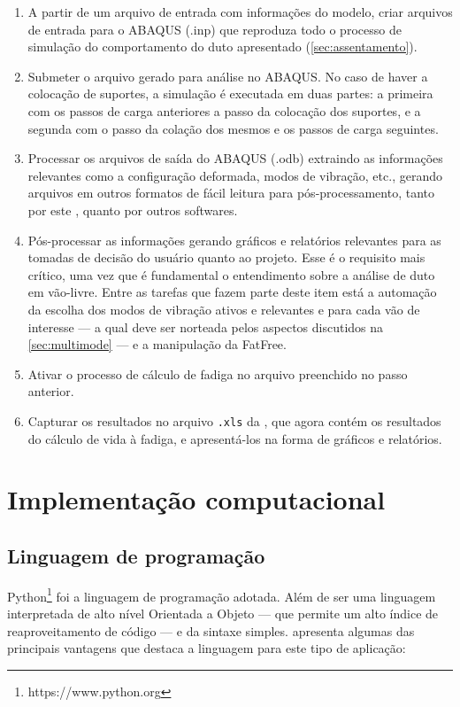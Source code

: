 \begin{enumerate}[label= (\arabic*)]
    \item A partir de um arquivo de entrada com informações do modelo, criar arquivos de entrada para o ABAQUS (.inp) que reproduza todo o processo de simulação do comportamento do duto apresentado (\autoref{sec:assentamento}).
    \item Submeter o arquivo gerado para análise no ABAQUS. No caso de haver a colocação de suportes, a simulação é executada em duas partes: a primeira com os passos de carga anteriores a passo da colocação dos suportes, e a segunda com o passo da colação dos mesmos e os passos de carga seguintes.
    \item Processar os arquivos de saída do ABAQUS (.odb) extraindo as informações relevantes como a configuração deformada, modos de vibração, etc., gerando arquivos em outros formatos de fácil leitura para pós-processamento, tanto por este \frame, quanto por outros softwares.
    \item Pós-processar as informações gerando gráficos e relatórios relevantes para as tomadas de decisão do usuário quanto ao projeto. Esse é o requisito mais crítico, uma vez que é fundamental o entendimento sobre a análise de duto em vão-livre. Entre as tarefas que fazem parte deste item está a automação da escolha dos modos de vibração ativos e relevantes e para cada vão de interesse --- a qual deve ser norteada pelos aspectos discutidos na \autoref{sec:multimode} --- e a manipulação da FatFree.
    \item Ativar o processo de cálculo de fadiga no arquivo preenchido no passo anterior.
    \item Capturar os resultados no arquivo \texttt{.xls} da \fatfree, que agora contém os resultados do cálculo de vida à fadiga, e apresentá-los na forma de gráficos e relatórios.
\end{enumerate}


\section{Implementação computacional}


\subsection{Linguagem de programação}

Python\footnote{https://www.python.org} foi a linguagem de programação adotada. Além de ser uma linguagem interpretada de alto nível Orientada a Objeto --- que permite um alto índice de reaproveitamento de código --- e da sintaxe simples.  apresenta algumas das principais vantagens que destaca a linguagem para este tipo de aplicação:

